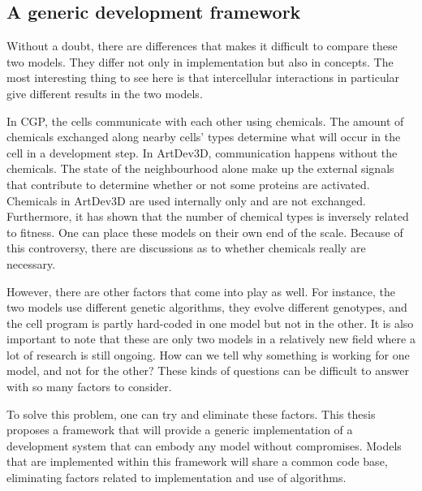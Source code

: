 \subsection{A generic development framework}
Without a doubt, there are differences that makes it difficult to compare these two models. They differ not only in implementation but also in concepts. The most interesting thing to see here is that intercellular interactions in particular give different results in the two models.

In CGP, the cells communicate with each other using chemicals. The amount of chemicals exchanged along nearby cells' types determine what will occur in the cell in a development step. In ArtDev3D, communication happens without the chemicals. The state of the neighbourhood alone make up the external signals that contribute to determine whether or not some proteins are activated. Chemicals in ArtDev3D are used internally only and are not exchanged. Furthermore, it has shown that the number of chemical types is inversely related to fitness. One can place these models on their own end of the scale. Because of this controversy, there are discussions as to whether chemicals really are necessary.

However, there are other factors that come into play as well. For instance, the two models use different genetic algorithms, they evolve different genotypes, and the cell program is partly hard-coded in one model but not in the other. It is also important to note that these are only two models in a relatively new field where a lot of research is still ongoing. How can we tell why something is working for one model, and not for the other? These kinds of questions can be difficult to answer with so many factors to consider.

To solve this problem, one can try and eliminate these factors. This thesis proposes a framework that will provide a generic implementation of a development system that can embody any model without compromises. Models that are implemented within this framework will share a common code base, eliminating factors related to implementation and use of algorithms.


